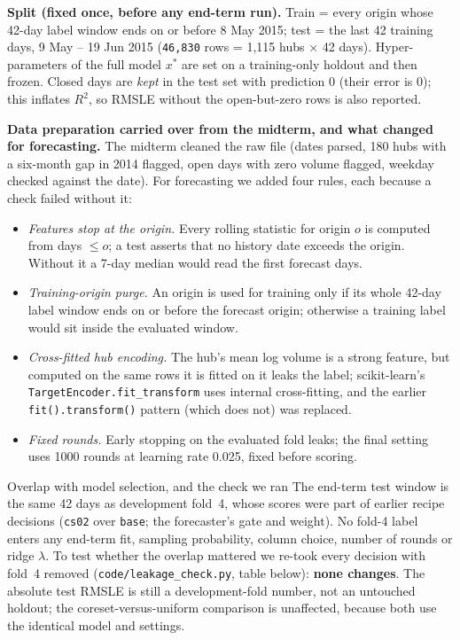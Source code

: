 \documentclass[10pt,a4paper,twocolumn]{article}
\newcommand{\n}[1]{\texttt{#1}}
\newcommand{\code}[1]{\texttt{#1}}
\begin{document}
\textbf{Split (fixed once, before any end-term run).} Train = every origin whose 42-day label window ends on or before
8 May 2015; test = the last 42 training days, 9 May -- 19 Jun 2015 (\n{46,830} rows = 1{,}115 hubs $\times$ 42 days).
Hyper-parameters of the full model $x^\ast$ are set on a training-only holdout and then frozen. Closed days are \emph{kept}
in the test set with prediction 0 (their error is 0); this inflates $R^2$, so RMSLE without the open-but-zero rows is also
reported.

\textbf{Data preparation carried over from the midterm, and what changed for forecasting.} The midterm cleaned the raw file
(dates parsed, 180 hubs with a six-month gap in 2014 flagged, open days with zero volume flagged, weekday checked against
the date). For forecasting we added four rules, each because a check failed without it:
\begin{itemize}
\item \emph{Features stop at the origin.} Every rolling statistic for origin $o$ is computed from days $\le o$; a test asserts
  that no history date exceeds the origin. Without it a 7-day median would read the first forecast days.
\item \emph{Training-origin purge.} An origin is used for training only if its whole 42-day label window ends on or before the
  forecast origin; otherwise a training label would sit inside the evaluated window.
\item \emph{Cross-fitted hub encoding.} The hub's mean log volume is a strong feature, but computed on the same rows it is fitted
  on it leaks the label; scikit-learn's \code{TargetEncoder.fit\_transform} uses internal cross-fitting, and the earlier
  \code{fit().transform()} pattern (which does not) was replaced.
\item \emph{Fixed rounds.} Early stopping on the evaluated fold leaks; the final setting uses 1000 rounds at learning rate
  0.025, fixed before scoring.
\end{itemize}

\begin{limit}{Overlap with model selection, and the check we ran}
The end-term test window is the same 42 days as development fold~4, whose scores were part of earlier recipe decisions
(\code{cs02} over \code{base}; the forecaster's gate and weight). No fold-4 label enters any end-term fit, sampling
probability, column choice, number of rounds or ridge $\lambda$. To test whether the overlap mattered we re-took every decision
with fold~4 removed (\code{code/leakage\_check.py}, table below): \textbf{none changes}. The absolute test RMSLE is still a
development-fold number, not an untouched holdout; the coreset-versus-uniform comparison is unaffected, because both use the
identical model and settings.
\end{limit}
\end{document}
